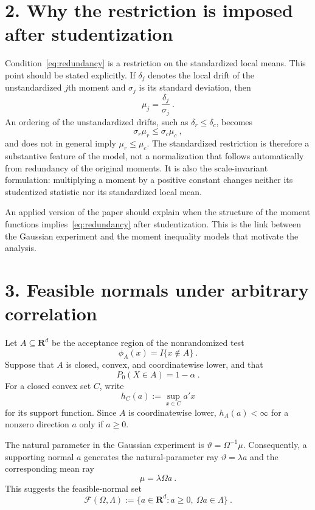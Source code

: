 \documentclass[12pt]{article}
\theoremstyle{remark}
\begin{document}
\section*{2. Why the restriction is imposed after studentization}

Condition~\eqref{eq:redundancy} is a restriction on the standardized local means.  This
point should be stated explicitly.  If $\delta_j$ denotes the local drift of the
unstandardized $j$th moment and $\sigma_j$ is its standard deviation, then
\[
\mu_j=\frac{\delta_j}{\sigma_j}~.
\]
An ordering of the unstandardized drifts, such as $\delta_r\le\delta_c$, becomes
\[
\sigma_r\mu_r\le\sigma_c\mu_c~,
\]
and does not in general imply $\mu_r\le\mu_c$.  The standardized restriction is
therefore a substantive feature of the model, not a normalization that follows
automatically from redundancy of the original moments.  It is also the scale-invariant
formulation: multiplying a moment by a positive constant changes neither its
studentized statistic nor its standardized local mean.

An applied version of the paper should explain when the structure of the moment
functions implies~\eqref{eq:redundancy} after studentization.  This is the link between
the Gaussian experiment and the moment inequality models that motivate the analysis.

\section*{3. Feasible normals under arbitrary correlation}

Let $A\subseteq\mathbf R^d$ be the acceptance region of the nonrandomized test
\[
\phi_A(x)=I\{x\notin A\}~.
\]
Suppose that $A$ is closed, convex, and coordinatewise lower, and that
\[
P_0(X\in A)=1-\alpha~.
\]
For a closed convex set $C$, write
\[
h_C(a):=\sup_{x\in C}a'x
\]
for its support function.  Since $A$ is coordinatewise lower, $h_A(a)<\infty$ for a
nonzero direction $a$ only if $a\ge0$.

The natural parameter in the Gaussian experiment is $\vartheta=\Omega^{-1}\mu$.
Consequently, a supporting normal $a$ generates the natural-parameter ray
$\vartheta=\lambda a$ and the corresponding mean ray
\[
\mu=\lambda\Omega a~.
\]
This suggests the feasible-normal set
\begin{equation}\label{eq:feasible-set}
\mathcal F(\Omega,\Lambda)
:=
\{a\in\mathbf R^d:a\ge0,\ \Omega a\in\Lambda\}~.
\end{equation}
\end{document}
